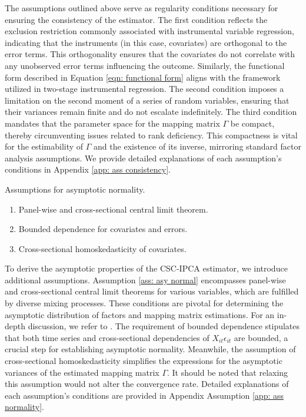 \documentclass[12pt]{article}
\begin{document}
The assumptions outlined above serve as regularity conditions necessary for ensuring the consistency of the estimator. The first condition reflects the exclusion restriction commonly associated with instrumental variable regression, indicating that the instruments (in this case, covariates) are orthogonal to the error terms. This orthogonality ensures that the covariates do not correlate with any unobserved error terms influencing the outcome. Similarly, the functional form described in Equation \ref{eqn: functional form} aligns with the framework utilized in two-stage instrumental regression. The second condition imposes a limitation on the second moment of a series of random variables, ensuring that their variances remain finite and do not escalate indefinitely. The third condition mandates that the parameter space for the mapping matrix $\Gamma$ be compact, thereby circumventing issues related to rank deficiency. This compactness is vital for the estimability of $\Gamma$ and the existence of its inverse, mirroring standard factor analysis assumptions. We provide detailed explanations of each assumption's conditions in Appendix \ref{app: ass consistency}.

\begin{assumption}
Assumptions for asymptotic normality.
\label{ass: asy normal}
\begin{enumerate}
    \item Panel-wise and cross-sectional central limit theorem.
    \item Bounded dependence for covariates and errors.
    \item Cross-sectional homoskedasticity of covariates.
\end{enumerate}
\end{assumption}

To derive the asymptotic properties of the CSC-IPCA estimator, we introduce additional assumptions. Assumption \ref{ass: asy normal} encompasses panel-wise and cross-sectional central limit theorems for various variables, which are fulfilled by diverse mixing processes. These conditions are pivotal for determining the asymptotic distribution of factors and mapping matrix estimations. For an in-depth discussion, we refer to \cite{kelly2020instrumented}. The requirement of bounded dependence stipulates that both time series and cross-sectional dependencies of $X_{it}\epsilon_{it}$ are bounded, a crucial step for establishing asymptotic normality. Meanwhile, the assumption of cross-sectional homoskedasticity simplifies the expressions for the asymptotic variances of the estimated mapping matrix $\Gamma$. It should be noted that relaxing this assumption would not alter the convergence rate. Detailed explanations of each assumption's conditions are provided in Appendix Assumption \ref{app: ass normality}.
\end{document}
